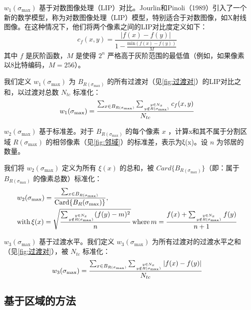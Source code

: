 $w_1(\sigma_{\text{max}})$ 基于对数图像处理（LIP）对比。Jourlin和Pinoli（1989）\cite{jourlin1989contrast}引入了一个新的数学模型，称为对数图像处理（LIP）模型，特别适合于对数图像，如X射线图像。在这种情况下，他们将两个像素之间的LIP对比度定义如下：
\begin{equation}
    c_f(x,y)=\frac{|f(x)-f(y)|}{1-\frac{\text{min}(f(x)-f(y))}{M}}
\end{equation}
其中 $f$ 是灰阶函数，$M$ 是使得 $2^n$ 严格高于灰阶范围的最低值（例如，如果像素以8比特编码，$M=256$）。

我们定义 $w_1(\sigma_{\text{max}})$ 为 $B_{R(\sigma_{\text{max}})}$ 的所有过渡对（见\cref{fig:过渡对}）的LIP对比之和，以过渡对总数 $N_{tc}$ 标准化：
\begin{equation}
    w_1(\sigma_{\text{max}})=\frac{\sum_{x \in B_{R(\sigma_{\text{max}})}} \sum_{y \in N_x \atop y \notin R(\sigma_{\text{max}})} c_f(x,y) } {N_{tc}}
\end{equation}

$w_2(\sigma_{\text{max}})$ 基于标准差。对于 $B_{R(\sigma_{\text{max}})}$ 的每个像素 $x$ ，计算x和其不属于分割区域 $R(\sigma_{\text{max}})$ 的相邻像素（见\cref{fig:邻域}）的标准差，表示为ξ(x)。设 $n$ 为邻居的数量。

我们将 $w_2(\sigma_{\text{max}})$ 定义为所有 $\xi (x)$ 的总和，被 $Card\{B_{R(\sigma_{\text{max}})}\}$（即：属于 $B_{R(\sigma_{\text{max}})}$ 的像素总数）标准化：
\begin{equation}
    \begin{aligned}
    & w_2(\sigma_{\text{max}})=\frac{\sum_{x \in B_{R(\sigma_{\text{max}})}}}{\text{Card}\{B_R(\sigma_{\text{max}})\}}, \\
    & \text{with} \, \xi(x)=\sqrt{\frac{\sum_{y \in N_x \atop y \notin R(\sigma_{\text{max}})}(f(y)-m)^2}{n}} \, \text{where} \, m=\frac{f(x)+\sum_{y \in N_x \atop y \notin R(\sigma_{\text{max}})}f(y)}{n+1} 
    \end{aligned}
\end{equation}

$w_3(\sigma_{\text{max}})$ 基于过渡水平。我们定义 $w_3(\sigma_{\text{max}})$ 为所有过渡对的过渡水平之和（见\cref{fig:过渡对}），被 $N_{tc}$ 标准化：
\begin{equation}
    w_3(\sigma_{\text{max}})=\frac{\sum_{x \in B_{R(\sigma_{\text{max}})}} \sum_{y \in N_x \atop y \notin R(\sigma_{\text{max}})} |f(x)-f(y)| } {N_{tc}}
\end{equation}

\subsection{基于区域的方法}


